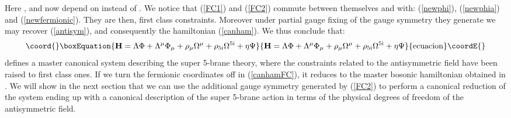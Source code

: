 \documentclass[a4paper,12pt]{article}
\def\CH{\widetilde{\cal{H}}}
\def\HCH{\widehat{\cal{H}}}
\def\CV{\cal{V}}
\def\CY{\cal{Y}}
\def\CZ{\cal{Z}}
\begin{document}
Here \myHighlight{${\CV}_\mu$}\coordHE{}, \myHighlight{$\CY$}\coordHE{} and \myHighlight{$\CZ$}\coordHE{} now depend on \myHighlight{${\HCH^{\mu\nu}}$}\coordHE{}
instead of \myHighlight{${\CH}^{\mu\nu}$}\coordHE{}. We notice that (\ref{FC1}) and
(\ref{FC2}) commute between themselves and with: (\ref{newphi}),
(\ref{newphia}) and (\ref{newfermionic}). They are then, first
class constraints. Moreover under partial gauge fixing of the
gauge symmetry they generate we may recover (\ref{antisym}), and
consequently the hamiltonian (\ref{canham}). We thus conclude
that:
\begin{equation}\coord{}\boxEquation{\label{canhamFC}
\rm{\bf{H}}=\Lambda{\Phi}+\Lambda^\mu{\Phi}_\mu+\rho_{\mu}\Omega^{\mu}+\rho_{5i}\Omega^{5i}+\eta\Psi
}{\rm{\bf{H}}=\Lambda{\Phi}+\Lambda^\mu{\Phi}_\mu+\rho_{\mu}\Omega^{\mu}+\rho_{5i}\Omega^{5i}+\eta\Psi
}{ecuacion}\coordE{}\end{equation}
defines a master canonical system describing the super 5-brane
theory, where the constraints related to the antisymmetric field
have been raised to first class ones. If we turn  the fermionic
coordinates off in (\ref{canhamFC}), it  reduces to the master
bosonic hamiltonian obtained in \cite{DeCastro:2001gp}. We will
show in the next section that we can use the additional gauge
symmetry generated by (\ref{FC2}) to perform a canonical reduction
of the system ending up with a canonical description of the super
5-brane action in terms of the physical degrees of freedom of the
antisymmetric field.
\end{document}
